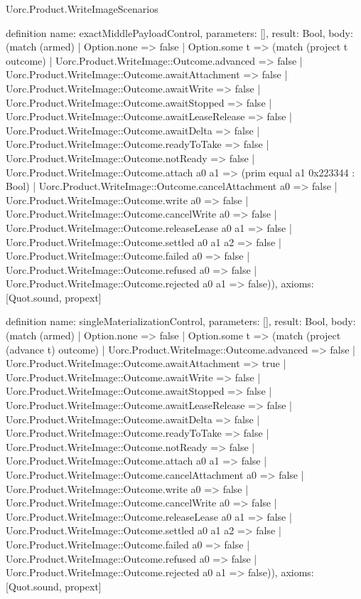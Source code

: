 \begin{lexlean}{Uorc.Product.WriteImageScenarios}
\begin{semanticmodule}
definition{
  name: exactMiddlePayloadControl,
  parameters: [],
  result: Bool,
  body: (match (armed)
    | Option.none => false
    | Option.some t => (match (project t outcome)
      | Uorc.Product.WriteImage::Outcome.advanced => false
      | Uorc.Product.WriteImage::Outcome.awaitAttachment => false
      | Uorc.Product.WriteImage::Outcome.awaitWrite => false
      | Uorc.Product.WriteImage::Outcome.awaitStopped => false
      | Uorc.Product.WriteImage::Outcome.awaitLeaseRelease => false
      | Uorc.Product.WriteImage::Outcome.awaitDelta => false
      | Uorc.Product.WriteImage::Outcome.readyToTake => false
      | Uorc.Product.WriteImage::Outcome.notReady => false
      | Uorc.Product.WriteImage::Outcome.attach a0 a1 => (prim equal a1 0x223344 : Bool)
      | Uorc.Product.WriteImage::Outcome.cancelAttachment a0 => false
      | Uorc.Product.WriteImage::Outcome.write a0 => false
      | Uorc.Product.WriteImage::Outcome.cancelWrite a0 => false
      | Uorc.Product.WriteImage::Outcome.releaseLease a0 a1 => false
      | Uorc.Product.WriteImage::Outcome.settled a0 a1 a2 => false
      | Uorc.Product.WriteImage::Outcome.failed a0 => false
      | Uorc.Product.WriteImage::Outcome.refused a0 => false
      | Uorc.Product.WriteImage::Outcome.rejected a0 a1 => false)),
  axioms: [Quot.sound, propext]
}

definition{
  name: singleMaterializationControl,
  parameters: [],
  result: Bool,
  body: (match (armed)
    | Option.none => false
    | Option.some t => (match (project (advance t) outcome)
      | Uorc.Product.WriteImage::Outcome.advanced => false
      | Uorc.Product.WriteImage::Outcome.awaitAttachment => true
      | Uorc.Product.WriteImage::Outcome.awaitWrite => false
      | Uorc.Product.WriteImage::Outcome.awaitStopped => false
      | Uorc.Product.WriteImage::Outcome.awaitLeaseRelease => false
      | Uorc.Product.WriteImage::Outcome.awaitDelta => false
      | Uorc.Product.WriteImage::Outcome.readyToTake => false
      | Uorc.Product.WriteImage::Outcome.notReady => false
      | Uorc.Product.WriteImage::Outcome.attach a0 a1 => false
      | Uorc.Product.WriteImage::Outcome.cancelAttachment a0 => false
      | Uorc.Product.WriteImage::Outcome.write a0 => false
      | Uorc.Product.WriteImage::Outcome.cancelWrite a0 => false
      | Uorc.Product.WriteImage::Outcome.releaseLease a0 a1 => false
      | Uorc.Product.WriteImage::Outcome.settled a0 a1 a2 => false
      | Uorc.Product.WriteImage::Outcome.failed a0 => false
      | Uorc.Product.WriteImage::Outcome.refused a0 => false
      | Uorc.Product.WriteImage::Outcome.rejected a0 a1 => false)),
  axioms: [Quot.sound, propext]
}


\end{semanticmodule}
\end{lexlean}
